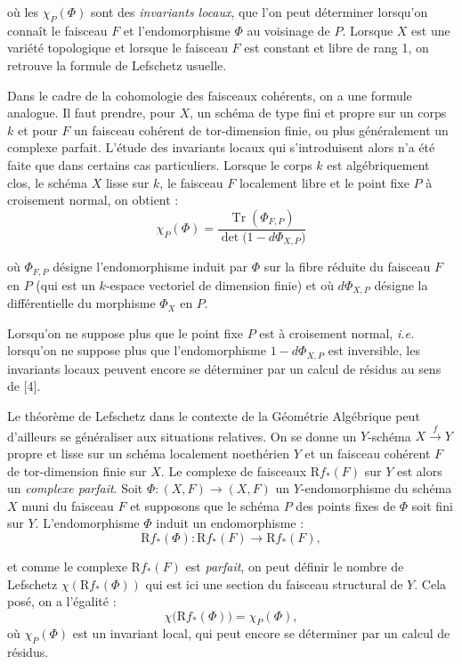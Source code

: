%
où les $\chi_P(\Phi)$ sont des \emph{invariants locaux}, que l'on peut
déterminer lorsqu'on connaît le faisceau $F$ et l'endomorphisme $\Phi$ au
voisinage de $P$. Lorsque $X$ est une variété topologique et lorsque le
faisceau $F$ est constant et libre de rang 1, on retrouve la formule de
Lefschetz usuelle.

Dans le cadre de la cohomologie des faisceaux cohérents, on a une formule
analogue. Il faut prendre, pour $X$, un schéma de type fini et propre sur un
corps $k$ et pour $F$ un faisceau cohérent de tor-dimension finie, ou plus
généralement un complexe parfait. L'étude des invariants locaux qui
s'introduisent alors n'a été faite que dans certains cas particuliers.
Lorsque le corps $k$ est algébriquement clos, le schéma $X$ lisse sur $k$,
le faisceau $F$ localement libre et le point fixe $P$ à croisement normal,
on obtient :
\[
\chi_P(\Phi)
=\frac{\operatorname{Tr}(\Phi_{F,P})}
       {\det\bigl(1-d\Phi_{X,P}\bigr)}
\]

où $\Phi_{F,P}$ désigne l'endomorphisme induit par $\Phi$ sur la fibre
réduite du faisceau $F$ en $P$ (qui est un $k$-espace vectoriel de dimension
finie) et où $d\Phi_{X,P}$ désigne la différentielle du morphisme $\Phi_X$
en $P$.

Lorsqu'on ne suppose plus que le point fixe $P$ est à croisement normal,
\emph{i.e.} lorsqu'on ne suppose plus que l'endomorphisme
$1-d\Phi_{X,P}$ est inversible, les invariants locaux peuvent encore se
déterminer par un calcul de résidus au sens de [4].

Le théorème de Lefschetz dans le contexte de la Géométrie Algébrique peut
d'ailleurs se généraliser aux situations relatives.
On se donne un $Y$-schéma
$X\xrightarrow{f}Y$ propre et lisse sur un schéma localement noethérien $Y$
et un faisceau cohérent $F$ de tor-dimension finie sur $X$. Le complexe de
faisceaux $\mathrm{R}f_*(F)$ sur $Y$ est alors un \emph{complexe parfait}.
Soit $\Phi\colon(X,F)\longrightarrow(X,F)$ un $Y$-endomorphisme du schéma
$X$ muni du faisceau $F$ et supposons que le schéma $P$ des points fixes de
$\Phi$ soit fini sur $Y$. L'endomorphisme $\Phi$ induit un endomorphisme :
\[
\mathrm{R}f_*(\Phi)\colon
\mathrm{R}f_*(F)\longrightarrow\mathrm{R}f_*(F),
\]

et comme le complexe $\mathrm{R}f_*(F)$ est \emph{parfait}, on peut définir
le nombre de Lefschetz $\chi(\mathrm{R}f_*(\Phi))$ qui est ici une section du
faisceau structural de $Y$. Cela posé, on a l'égalité :
\[
\chi\bigl(\mathrm{R}f_*(\Phi)\bigr)=\chi_P(\Phi),
\]
où $\chi_P(\Phi)$ est un invariant local, qui peut encore se déterminer par
un calcul de résidus.

